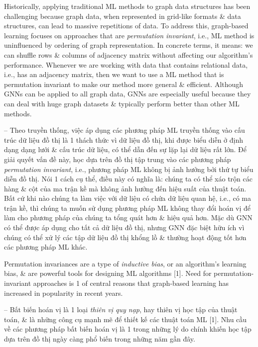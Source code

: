 \documentclass{article}
\begin{document}
\begin{itemize}
\begin{itemize}
\begin{itemize}
            Historically, applying traditional ML methods to graph data structures has been challenging because graph data, when represented in grid-like formats \& data structures, can lead to massive repetitions of data. To address this, graph-based learning focuses on approaches that are {\it permutation invariant}, i.e., ML method is uninfluenced by ordering of graph representation. In concrete terms, it means: we can shuffle rows \& columns of adjacency matrix without affecting our algorithm's performance. Whenever we are working with data that contains relational data, i.e., has an adjacency matrix, then we want to use a ML method that is permutation invariant to make our method more general \& efficient. Although GNNs can be applied to all graph data, GNNs are especially useful because they can deal with huge graph datasets \& typically perform better than other ML methods.

            -- Theo truyền thống, việc áp dụng các phương pháp ML truyền thống vào cấu trúc dữ liệu đồ thị là 1 thách thức vì dữ liệu đồ thị, khi được biểu diễn ở định dạng dạng lưới \& cấu trúc dữ liệu, có thể dẫn đến sự lặp lại dữ liệu rất lớn. Để giải quyết vấn đề này, học dựa trên đồ thị tập trung vào các phương pháp {\it permutation invariant}, i.e., phương pháp ML không bị ảnh hưởng bởi thứ tự biểu diễn đồ thị. Nói 1 cách cụ thể, điều này có nghĩa là: chúng ta có thể xáo trộn các hàng \& cột của ma trận kề mà không ảnh hưởng đến hiệu suất của thuật toán. Bất cứ khi nào chúng ta làm việc với dữ liệu có chứa dữ liệu quan hệ, i.e., có ma trận kề, thì chúng ta muốn sử dụng phương pháp ML không thay đổi hoán vị để làm cho phương pháp của chúng ta tổng quát hơn \& hiệu quả hơn. Mặc dù GNN có thể được áp dụng cho tất cả dữ liệu đồ thị, nhưng GNN đặc biệt hữu ích vì chúng có thể xử lý các tập dữ liệu đồ thị khổng lồ \& thường hoạt động tốt hơn các phương pháp ML khác.

            Permutation invariances are a type of {\it inductive bias}, or an algorithm's learning bias, \& are powerful tools for designing ML algorithms [1]. Need for permutation-invariant approaches is 1 of central reasons that graph-based learning has increased in popularity in recent years.

            -- Bất biến hoán vị là 1 loại {\it thiên vị quy nạp}, hay thiên vị học tập của thuật toán, \& là những công cụ mạnh mẽ để thiết kế các thuật toán ML [1]. Nhu cầu về các phương pháp bất biến hoán vị là 1 trong những lý do chính khiến học tập dựa trên đồ thị ngày càng phổ biến trong những năm gần đây.


\end{itemize}
\end{itemize}
\end{itemize}
\end{document}
